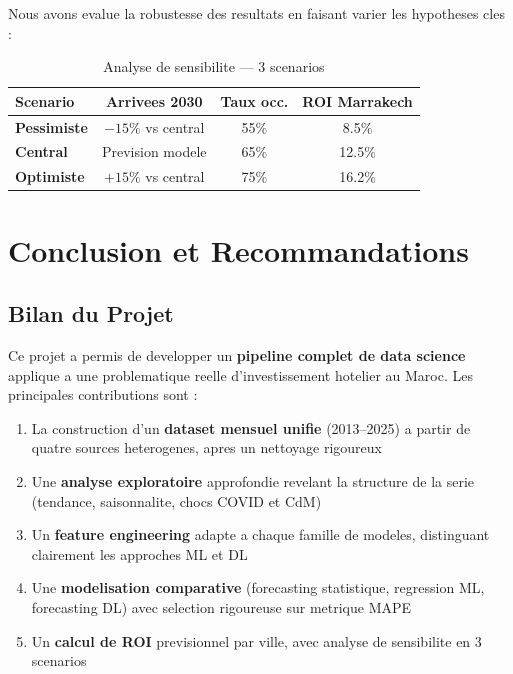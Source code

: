 \documentclass[12pt,a4paper]{report}
\begin{document}
\begin{itemize}[leftmargin=1.5em]
Nous avons evalue la robustesse des resultats en faisant varier les
hypotheses cles :

\begin{table}[H]
\centering\small\renewcommand{\arraystretch}{1.4}
\begin{tabular}{lccc}
\toprule
\textbf{Scenario} & \textbf{Arrivees 2030} & \textbf{Taux occ.} &
  \textbf{ROI Marrakech} \\
\midrule
\textbf{Pessimiste} & $-15\%$ vs central & 55\% & 8.5\% \\
\textbf{Central}    & Prevision modele    & 65\% & 12.5\% \\
\textbf{Optimiste}  & $+15\%$ vs central  & 75\% & 16.2\% \\
\bottomrule
\end{tabular}
\caption{Analyse de sensibilite --- 3 scenarios}
\end{table}

\chapter{Conclusion et Recommandations}

\section{Bilan du Projet}

Ce projet a permis de developper un \textbf{pipeline complet de data science}
applique a une problematique reelle d'investissement hotelier au Maroc.
Les principales contributions sont :

\begin{enumerate}[leftmargin=1.5em]
  \item La construction d'un \textbf{dataset mensuel unifie} (2013--2025)
        a partir de quatre sources heterogenes, apres un nettoyage rigoureux
  \item Une \textbf{analyse exploratoire} approfondie revelant la structure
        de la serie (tendance, saisonnalite, chocs COVID et CdM)
  \item Un \textbf{feature engineering} adapte a chaque famille de modeles,
        distinguant clairement les approches ML et DL
  \item Une \textbf{modelisation comparative} (forecasting statistique,
        regression ML, forecasting DL) avec selection rigoureuse
        sur metrique MAPE
  \item Un \textbf{calcul de ROI} previsionnel par ville, avec analyse
        de sensibilite en 3 scenarios
\end{enumerate}


\end{itemize}
\end{document}
